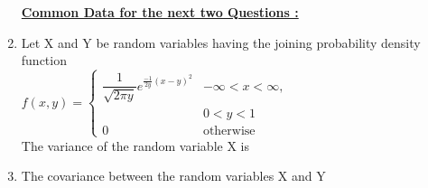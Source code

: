 \begin{enumerate}[label=\thesection.\arabic*.,ref=\thesection.\theenumi]
\begin{enumerate}
\end{enumerate}
\solution


\begin{center}
    \centering\underline{\textbf{Common Data for the next two Questions :}}
    \end{center}
    
\item     Let X and Y be random variables having the joining probability density function \\
    $
    f(x,y)=
    \begin{cases}
    {\dfrac{1}{\sqrt{2 \pi y}}}e^{\frac{-1}{2y}(x-y)^2}
    & -\infty < x < \infty,\\  
    &  0 < y < 1
    \\
    0 & \text{otherwise}
    \end{cases}
    $ \\
    
    The variance of the random variable X is 
    
    \begin{enumerate}
    \end{enumerate}
    
    \item The covariance between the random variables X and Y
    
    \begin{enumerate}
    \begin{multicols}{2}
    \setlength\itemsep{2em}
    

\end{multicols}
\end{enumerate}
\end{enumerate}
